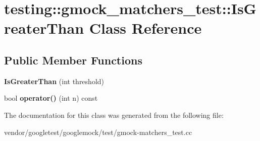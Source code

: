 \hypertarget{classtesting_1_1gmock__matchers__test_1_1_is_greater_than}{}\section{testing\+:\+:gmock\+\_\+matchers\+\_\+test\+:\+:Is\+Greater\+Than Class Reference}
\label{classtesting_1_1gmock__matchers__test_1_1_is_greater_than}
\subsection*{Public Member Functions}
\begin{DoxyCompactItemize}
\item 
\mbox{\label{classtesting_1_1gmock__matchers__test_1_1_is_greater_than_a6682979fb1ed5511995e575954d07aaf}} 
{\bfseries Is\+Greater\+Than} (int threshold)
\item 
\mbox{\label{classtesting_1_1gmock__matchers__test_1_1_is_greater_than_a34b455148a2d299c654bc4443db0af67}} 
bool {\bfseries operator()} (int n) const
\end{DoxyCompactItemize}


The documentation for this class was generated from the following file\+:\begin{DoxyCompactItemize}
\item 
vendor/googletest/googlemock/test/gmock-\/matchers\+\_\+test.\+cc\end{DoxyCompactItemize}
